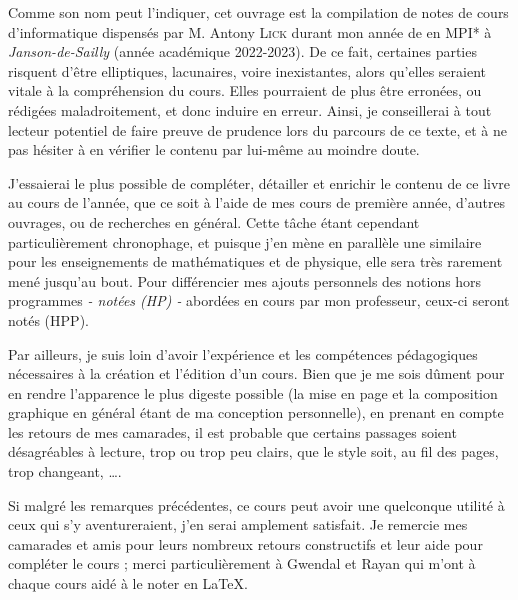 \documentclass[a4paper,french,bookmarks]{book}
\begin{document}
    \newline\newline\newline
    
    \begin{center}
        \begin{minipage}{0.85\linewidth}
            \large \qquad Comme son nom peut l'indiquer, cet ouvrage est la compilation de notes de cours d'informatique dispensés par M. Antony
            \textsc{Lick} durant mon année de  en \textsf{MPI*} à \emph{Janson-de-Sailly} (année académique 2022-2023). De ce fait,
            certaines parties risquent d'être elliptiques, lacunaires, voire inexistantes, alors qu'elles seraient vitale à la compréhension du
            cours. Elles pourraient de plus être erronées, ou rédigées maladroitement, et donc induire en erreur. Ainsi, je conseillerai à tout
            lecteur potentiel de faire preuve de prudence lors du parcours de ce texte, et à ne pas hésiter à en vérifier le contenu par lui-même
            au moindre doute.\newline
            
            J'essaierai le plus possible de compléter, détailler et enrichir le contenu de ce livre au cours de l'année, que ce soit à l'aide de
            mes cours de première année, d'autres ouvrages, ou de recherches en général. Cette tâche étant cependant particulièrement chronophage,
            et puisque j'en mène en parallèle une similaire pour les enseignements de mathématiques et de physique, elle sera très rarement mené
            jusqu'au bout. Pour différencier mes ajouts personnels des notions hors programmes \emph{- notées (HP) -} abordées en cours par mon
            professeur, ceux-ci seront notés (HPP).\newline
            
            Par ailleurs, je suis loin d'avoir l'expérience et les compétences pédagogiques nécessaires à la création et l'édition d'un cours. Bien
            que je me sois dûment pour en rendre l'apparence le plus digeste possible (la mise en page et la composition graphique en général étant
            de ma conception personnelle), en prenant en compte les retours de mes camarades, il est probable que certains passages soient
            désagréables à lecture, trop  ou trop peu clairs, que le style soit, au fil des pages, trop changeant, \etc
            \dots.\newline
    
            Si malgré les remarques précédentes, ce cours peut avoir une quelconque utilité à ceux qui s'y aventureraient, j'en serai amplement
            satisfait. Je remercie mes camarades et amis pour leurs nombreux retours constructifs et leur aide pour compléter le cours ; merci
            particulièrement à Gwendal et Rayan qui m'ont à chaque cours aidé à le noter en \LaTeX. \newline\newline\newline\text{}
        \end{minipage}
    \end{center}
    
\end{document}
